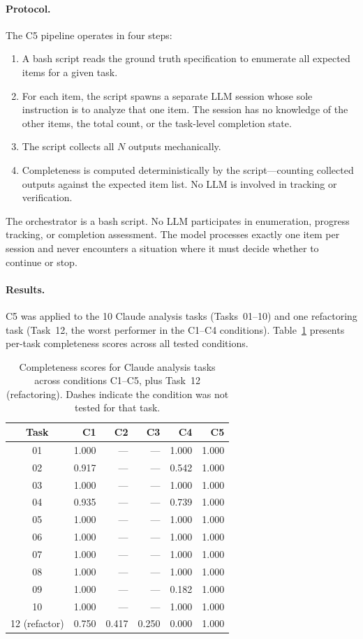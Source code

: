 \paragraph{Protocol.}
The C5 pipeline operates in four steps:
\begin{enumerate}[nosep]
  \item A bash script reads the ground truth specification to enumerate all expected items for a given task.
  \item For each item, the script spawns a separate LLM session whose sole instruction is to analyze that one item. The session has no knowledge of the other items, the total count, or the task-level completion state.
  \item The script collects all $N$ outputs mechanically.
  \item Completeness is computed deterministically by the script---counting collected outputs against the expected item list. No LLM is involved in tracking or verification.
\end{enumerate}
The orchestrator is a bash script. No LLM participates in enumeration, progress tracking, or completion assessment. The model processes exactly one item per session and never encounters a situation where it must decide whether to continue or stop.

\paragraph{Results.}
C5 was applied to the 10 Claude analysis tasks (Tasks~01--10) and one refactoring task (Task~12, the worst performer in the C1--C4 conditions). Table~\ref{tab:c5-results} presents per-task completeness scores across all tested conditions.

\begin{table}[htbp]
\centering
\caption{Completeness scores for Claude analysis tasks across conditions C1--C5, plus Task~12 (refactoring). Dashes indicate the condition was not tested for that task.}
\label{tab:c5-results}
\begin{tabular}{crrrrr}
\toprule
Task & C1 & C2 & C3 & C4 & C5 \\
\midrule
01 & 1.000 & --- & --- & 1.000 & 1.000 \\
02 & 0.917 & --- & --- & 0.542 & 1.000 \\
03 & 1.000 & --- & --- & 1.000 & 1.000 \\
04 & 0.935 & --- & --- & 0.739 & 1.000 \\
05 & 1.000 & --- & --- & 1.000 & 1.000 \\
06 & 1.000 & --- & --- & 1.000 & 1.000 \\
07 & 1.000 & --- & --- & 1.000 & 1.000 \\
08 & 1.000 & --- & --- & 1.000 & 1.000 \\
09 & 1.000 & --- & --- & 0.182 & 1.000 \\
10 & 1.000 & --- & --- & 1.000 & 1.000 \\
\midrule
12 (refactor) & 0.750 & 0.417 & 0.250 & 0.000 & 1.000 \\
\bottomrule
\end{tabular}
\end{table}

